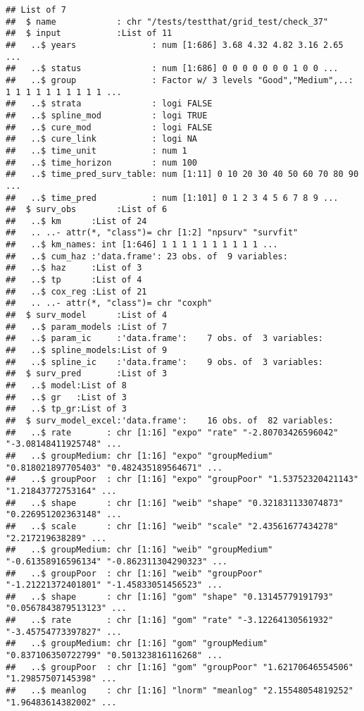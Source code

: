 \documentclass[
]{article}
\begin{document}
\begin{verbatim}
## List of 7
##  $ name            : chr "/tests/testthat/grid_test/check_37"
##  $ input           :List of 11
##   ..$ years               : num [1:686] 3.68 4.32 4.82 3.16 2.65 ...
##   ..$ status              : num [1:686] 0 0 0 0 0 0 0 1 0 0 ...
##   ..$ group               : Factor w/ 3 levels "Good","Medium",..: 1 1 1 1 1 1 1 1 1 1 ...
##   ..$ strata              : logi FALSE
##   ..$ spline_mod          : logi TRUE
##   ..$ cure_mod            : logi FALSE
##   ..$ cure_link           : logi NA
##   ..$ time_unit           : num 1
##   ..$ time_horizon        : num 100
##   ..$ time_pred_surv_table: num [1:11] 0 10 20 30 40 50 60 70 80 90 ...
##   ..$ time_pred           : num [1:101] 0 1 2 3 4 5 6 7 8 9 ...
##  $ surv_obs        :List of 6
##   ..$ km      :List of 24
##   .. ..- attr(*, "class")= chr [1:2] "npsurv" "survfit"
##   ..$ km_names: int [1:646] 1 1 1 1 1 1 1 1 1 1 ...
##   ..$ cum_haz :'data.frame': 23 obs. of  9 variables:
##   ..$ haz     :List of 3
##   ..$ tp      :List of 4
##   ..$ cox_reg :List of 21
##   .. ..- attr(*, "class")= chr "coxph"
##  $ surv_model      :List of 4
##   ..$ param_models :List of 7
##   ..$ param_ic     :'data.frame':    7 obs. of  3 variables:
##   ..$ spline_models:List of 9
##   ..$ spline_ic    :'data.frame':    9 obs. of  3 variables:
##  $ surv_pred       :List of 3
##   ..$ model:List of 8
##   ..$ gr   :List of 3
##   ..$ tp_gr:List of 3
##  $ surv_model_excel:'data.frame':    16 obs. of  82 variables:
##   ..$ rate       : chr [1:16] "expo" "rate" "-2.80703426596042" "-3.08148411925748" ...
##   ..$ groupMedium: chr [1:16] "expo" "groupMedium" "0.818021897705403" "0.482435189564671" ...
##   ..$ groupPoor  : chr [1:16] "expo" "groupPoor" "1.53752320421143" "1.21843772753164" ...
##   ..$ shape      : chr [1:16] "weib" "shape" "0.321831133074873" "0.226951202363148" ...
##   ..$ scale      : chr [1:16] "weib" "scale" "2.43561677434278" "2.217219638289" ...
##   ..$ groupMedium: chr [1:16] "weib" "groupMedium" "-0.61358916596134" "-0.862311304290323" ...
##   ..$ groupPoor  : chr [1:16] "weib" "groupPoor" "-1.21221372401801" "-1.45833051456523" ...
##   ..$ shape      : chr [1:16] "gom" "shape" "0.13145779191793" "0.0567843879513123" ...
##   ..$ rate       : chr [1:16] "gom" "rate" "-3.12264130561932" "-3.45754773397827" ...
##   ..$ groupMedium: chr [1:16] "gom" "groupMedium" "0.837106350722799" "0.501323816116268" ...
##   ..$ groupPoor  : chr [1:16] "gom" "groupPoor" "1.62170646554506" "1.29857507145398" ...
##   ..$ meanlog    : chr [1:16] "lnorm" "meanlog" "2.15548054819252" "1.96483614382002" ...

\end{verbatim}
\end{document}
